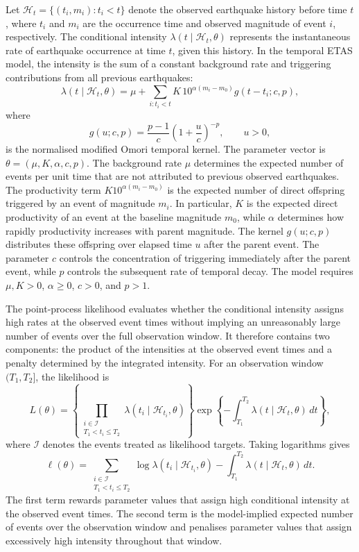 \documentclass{statsmsc}
\begin{document}
Let
\(\mathcal{H}_t=\{(t_i,m_i):t_i<t\}\) denote the observed earthquake history
before time \(t\), where \(t_i\) and \(m_i\) are the occurrence time and
observed magnitude of event \(i\), respectively. The conditional intensity
\(\lambda(t\mid\mathcal{H}_t,\theta)\) represents the instantaneous rate of
earthquake occurrence at time \(t\), given this history. In the temporal ETAS
model, the intensity is the sum of a constant background rate and triggering
contributions from all previous earthquakes:
\begin{equation}
\lambda(t\mid\mathcal{H}_t,\theta)
=
\mu+
\sum_{i:t_i<t}
K\,10^{\alpha(m_i-m_0)}
g(t-t_i;c,p),
\label{eq:etas}
\end{equation}
where
\[
g(u;c,p)
=
\frac{p-1}{c}
\left(1+\frac{u}{c}\right)^{-p},
\qquad u>0,
\]
is the normalised modified Omori temporal kernel. The parameter vector is
\(\theta=(\mu,K,\alpha,c,p)\). The background rate \(\mu\) determines the
expected number of events per unit time that are not attributed to previous
observed earthquakes. The productivity term
\(K10^{\alpha(m_i-m_0)}\) is the expected number of direct offspring triggered
by an event of magnitude \(m_i\). In particular, \(K\) is the expected direct
productivity of an event at the baseline magnitude \(m_0\), while \(\alpha\)
determines how rapidly productivity increases with parent magnitude. The
kernel \(g(u;c,p)\) distributes these offspring over elapsed time \(u\) after
the parent event. The parameter \(c\) controls the concentration of triggering
immediately after the parent event, while \(p\) controls the subsequent rate
of temporal decay. The model requires \(\mu,K>0\), \(\alpha\geq0\), \(c>0\),
and \(p>1\).

The point-process likelihood evaluates whether the conditional intensity
assigns high rates at the observed event times without implying an
unreasonably large number of events over the full observation window. It
therefore contains two components: the product of the intensities at the
observed event times and a penalty determined by the integrated intensity.
For an observation window \((T_1,T_2]\), the likelihood is
\[
L(\theta)
=
\left\{
\prod_{\substack{i\in\mathcal I\\T_1<t_i\leq T_2}}
\lambda(t_i\mid\mathcal H_{t_i},\theta)
\right\}
\exp\left\{
-\int_{T_1}^{T_2}
\lambda(t\mid\mathcal H_t,\theta)\,dt
\right\},
\]
where \(\mathcal I\) denotes the events treated as likelihood targets. Taking
logarithms gives
\begin{equation}
\ell(\theta)
=
\sum_{\substack{i\in\mathcal I\\T_1<t_i\leq T_2}}
\log\lambda(t_i\mid\mathcal H_{t_i},\theta)
-
\int_{T_1}^{T_2}
\lambda(t\mid\mathcal H_t,\theta)\,dt.
\label{eq:pp_likelihood}
\end{equation}
The first term rewards parameter values that assign high conditional
intensity at the observed event times. The second term is the model-implied
expected number of events over the observation window and penalises parameter
values that assign excessively high intensity throughout that window.
\end{document}
